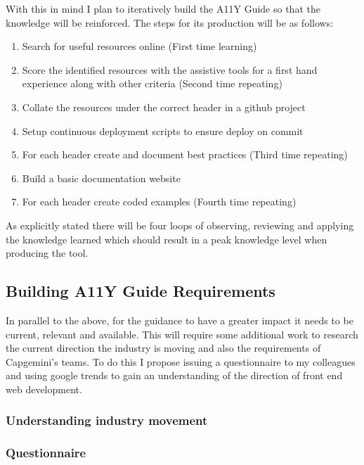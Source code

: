 With this in mind I plan to iteratively build the A11Y Guide so
that the knowledge will be reinforced. The steps for its production will be
as follows:
\begin{enumerate}
  \item Search for useful resources online (First time learning)
  \item Score the identified resources with the assistive tools for a first hand
  experience along with other criteria (Second time repeating)
  \item Collate the resources under the correct header in a github project
  \item Setup continuous deployment scripts to ensure deploy on commit
  \item For each header create and document best practices (Third time
  repeating)
  \item Build a basic documentation website
  \item For each header create coded examples (Fourth time repeating)
\end{enumerate}

As explicitly stated there will be four loops of observing, reviewing and
applying the knowledge learned which should result in a peak knowledge level
when producing the tool.

\subsection{Building A11Y Guide Requirements}
In parallel to the above, for the guidance to have a greater impact it
needs to be current, relevant and available. This will require some additional
work to research the current direction the industry is moving and also the
requirements of Capgemini's teams. To do this I propose issuing a
questionnaire to my colleagues and using google trends to gain an
understanding of the direction
of front end web development.

\subsubsection{Understanding industry movement}


\subsubsection{Questionnaire}

